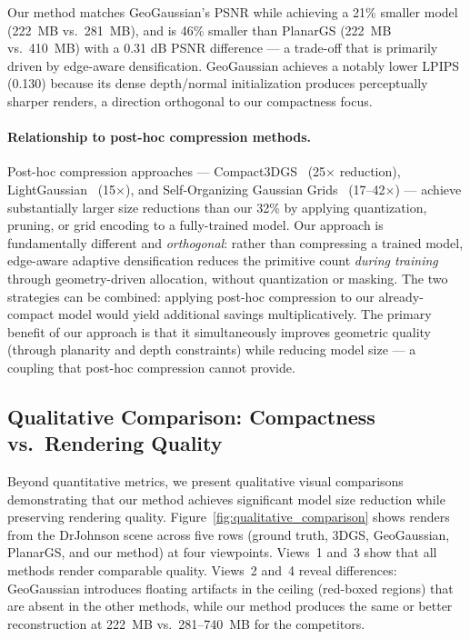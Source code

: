 Our method matches GeoGaussian's PSNR while achieving a 21\% smaller model (222~MB vs.\ 281~MB), and is 46\% smaller than PlanarGS (222~MB vs.\ 410~MB) with a 0.31 dB PSNR difference — a trade-off that is primarily driven by edge-aware densification. GeoGaussian achieves a notably lower LPIPS (0.130) because its dense depth/normal initialization produces perceptually sharper renders, a direction orthogonal to our compactness focus.

\paragraph{Relationship to post-hoc compression methods.} Post-hoc compression approaches — Compact3DGS~\cite{compact3dgs} (25$\times$ reduction), LightGaussian~\cite{lightgaussian} (15$\times$), and Self-Organizing Gaussian Grids~\cite{selforganizinggs} (17--42$\times$) — achieve substantially larger size reductions than our 32\% by applying quantization, pruning, or grid encoding to a fully-trained model. Our approach is fundamentally different and \emph{orthogonal}: rather than compressing a trained model, edge-aware adaptive densification reduces the primitive count \emph{during training} through geometry-driven allocation, without quantization or masking. The two strategies can be combined: applying post-hoc compression to our already-compact model would yield additional savings multiplicatively. The primary benefit of our approach is that it simultaneously improves geometric quality (through planarity and depth constraints) while reducing model size — a coupling that post-hoc compression cannot provide.

\subsection{Qualitative Comparison: Compactness vs.~Rendering Quality}

Beyond quantitative metrics, we present qualitative visual comparisons demonstrating that our method achieves significant model size reduction while preserving rendering quality. Figure~\ref{fig:qualitative_comparison} shows renders from the DrJohnson scene across five rows (ground truth, 3DGS, GeoGaussian, PlanarGS, and our method) at four viewpoints. Views~1 and~3 show that all methods render comparable quality. Views~2 and~4 reveal differences: GeoGaussian introduces floating artifacts in the ceiling (red-boxed regions) that are absent in the other methods, while our method produces the same or better reconstruction at 222~MB vs.\ 281--740~MB for the competitors.

